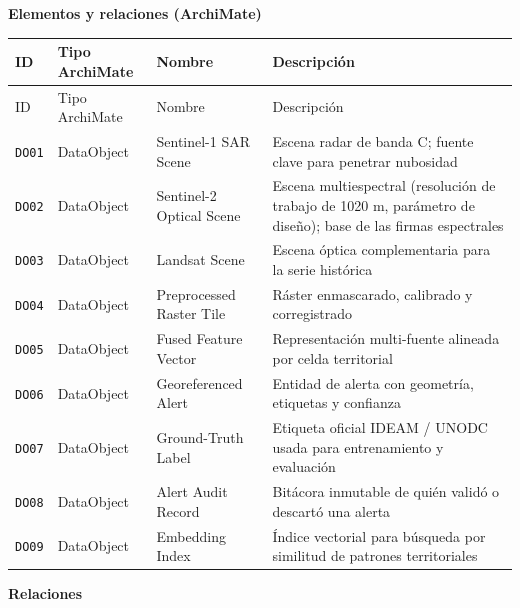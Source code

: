 \documentclass{article}
\newcommand{\mdhfour}[1]{\par\medskip\noindent\textbf{#1}\par\nobreak\smallskip}
\begin{document}
\mdhfour{Elementos y relaciones (ArchiMate)}

{\small
\begin{longtable}{@{}L{0.40in}L{0.75in}L{1.10in}L{3.69in}@{}}
\toprule
ID & Tipo ArchiMate & Nombre & Descripción \\
\midrule
\endfirsthead
\toprule
ID & Tipo ArchiMate & Nombre & Descripción \\
\midrule
\endhead
\bottomrule
\endlastfoot
\texttt{DO01} & DataObject & Sentinel-1 SAR Scene & Escena radar de banda C; fuente clave para penetrar nubosidad \\
\texttt{DO02} & DataObject & Sentinel-2 Optical Scene & Escena multiespectral (resolución de trabajo de 10\textendash{}20 m, parámetro de diseño); base de las firmas espectrales \\
\texttt{DO03} & DataObject & Landsat Scene & Escena óptica complementaria para la serie histórica \\
\texttt{DO04} & DataObject & Preprocessed Raster Tile & Ráster enmascarado, calibrado y corregistrado \\
\texttt{DO05} & DataObject & Fused Feature Vector & Representación multi-fuente alineada por celda territorial \\
\texttt{DO06} & DataObject & Georeferenced Alert & Entidad de alerta con geometría, etiquetas y confianza \\
\texttt{DO07} & DataObject & Ground-Truth Label & Etiqueta oficial IDEAM / UNODC usada para entrenamiento y evaluación \\
\texttt{DO08} & DataObject & Alert Audit Record & Bitácora inmutable de quién validó o descartó una alerta \\
\texttt{DO09} & DataObject & Embedding Index & Índice vectorial para búsqueda por similitud de patrones territoriales \\
\end{longtable}
}

\mdhfour{Relaciones}
\end{document}
